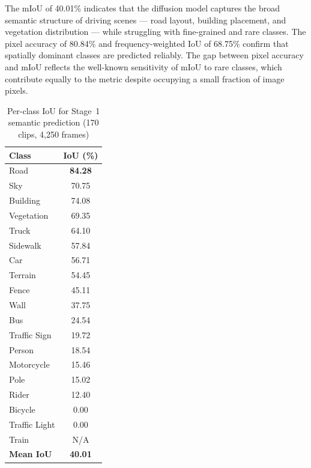 The mIoU of 40.01\% indicates that the diffusion model captures the broad semantic structure of driving scenes — road layout, building placement, and vegetation distribution — while struggling with fine-grained and rare classes. The pixel accuracy of 80.84\% and frequency-weighted IoU of 68.75\% confirm that spatially dominant classes are predicted reliably. The gap between pixel accuracy and mIoU reflects the well-known sensitivity of mIoU to rare classes, which contribute equally to the metric despite occupying a small fraction of image pixels.

\begin{table}[t]
    \centering
    \caption{Per-class IoU for Stage~1 semantic prediction (170 clips, 4{,}250 frames)}
    \label{tab:stage1_per_class}
    \begin{tabular}{lc}
        \toprule
        \textbf{Class} & \textbf{IoU (\%)} \\
        \midrule
        Road        & \textbf{84.28} \\
        Sky         & 70.75 \\
        Building    & 74.08 \\
        Vegetation  & 69.35 \\
        Truck       & 64.10 \\
        Sidewalk    & 57.84 \\
        Car         & 56.71 \\
        Terrain     & 54.45 \\
        Fence       & 45.11 \\
        Wall        & 37.75 \\
        Bus         & 24.54 \\
        Traffic Sign & 19.72 \\
        Person      & 18.54 \\
        Motorcycle  & 15.46 \\
        Pole        & 15.02 \\
        Rider       & 12.40 \\
        Bicycle     & 0.00 \\
        Traffic Light & 0.00 \\
        Train       & \multicolumn{1}{c}{N/A} \\
        \midrule
        \textbf{Mean IoU} & \textbf{40.01} \\
        \bottomrule
    \end{tabular}
\end{table}

